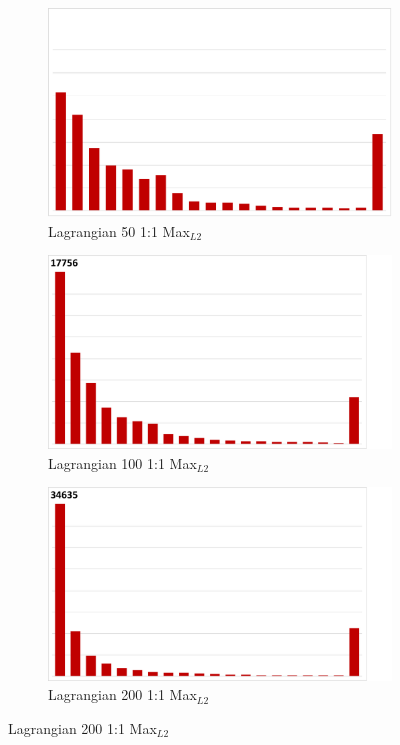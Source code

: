 \begin{figure}
\hspace{1mm}
\begin{subfigure}{0.24\textwidth}
\centering
\includegraphics[width=0.7\linewidth]{results/nyx/Lag50_1_Max.pdf}
\caption{Lagrangian 50 1:1 Max$_{L2}$}
\end{subfigure}
\hspace{1mm}
\begin{subfigure}{0.24\textwidth}
\centering
\includegraphics[width=0.7\linewidth, trim={0cm 0cm 2.5cm 0cm}, clip]{results/nyx/Lag100_1_Max.pdf}
\caption{Lagrangian 100 1:1 Max$_{L2}$}
\end{subfigure}
\hspace{1mm}
\begin{subfigure}{0.24\textwidth}
\centering
\includegraphics[width=0.7\linewidth, trim={0cm 0cm 2.5cm 0cm}, clip]{results/nyx/Lag200_1_Max.pdf}
\caption{Lagrangian 200 1:1 Max$_{L2}$}
\end{subfigure}

\end{figure}
